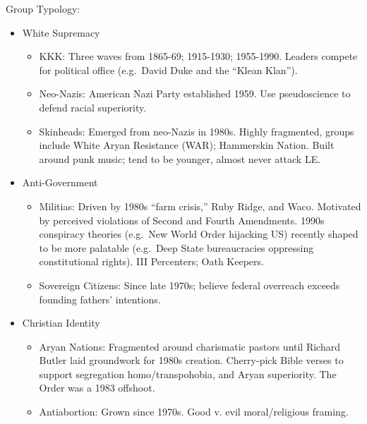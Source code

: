 \documentclass[
]{article}
\begin{document}
Group Typology:

\begin{itemize}
\item
  White Supremacy

  \begin{itemize}
  \item
    KKK: Three waves from 1865-69; 1915-1930; 1955-1990. Leaders compete
    for political office (e.g.~David Duke and the ``Klean Klan'').
  \item
    Neo-Nazis: American Nazi Party established 1959. Use pseudoscience
    to defend racial superiority.
  \item
    Skinheads: Emerged from neo-Nazis in 1980s. Highly fragmented,
    groups include White Aryan Resistance (WAR); Hammerskin Nation.
    Built around punk music; tend to be younger, almost never attack LE.
  \end{itemize}
\item
  Anti-Government

  \begin{itemize}
  \item
    Militias: Driven by 1980s ``farm crisis,'' Ruby Ridge, and Waco.
    Motivated by perceived violations of Second and Fourth Amendments.
    1990s conspiracy theories (e.g.~New World Order hijacking US)
    recently shaped to be more palatable (e.g.~Deep State bureaucracies
    oppressing constitutional rights). III Percenters; Oath Keepers.
  \item
    Sovereign Citizens: Since late 1970s; believe federal overreach
    exceeds founding fathers' intentions.
  \end{itemize}
\item
  Christian Identity

  \begin{itemize}
  \item
    Aryan Nations: Fragmented around charismatic pastors until Richard
    Butler laid groundwork for 1980s creation. Cherry-pick Bible verses
    to support segregation homo/transpohobia, and Aryan superiority. The
    Order was a 1983 offshoot.
  \item
    Antiabortion: Grown since 1970s. Good v. evil moral/religious
    framing.
  \end{itemize}
\end{itemize}
\end{document}
